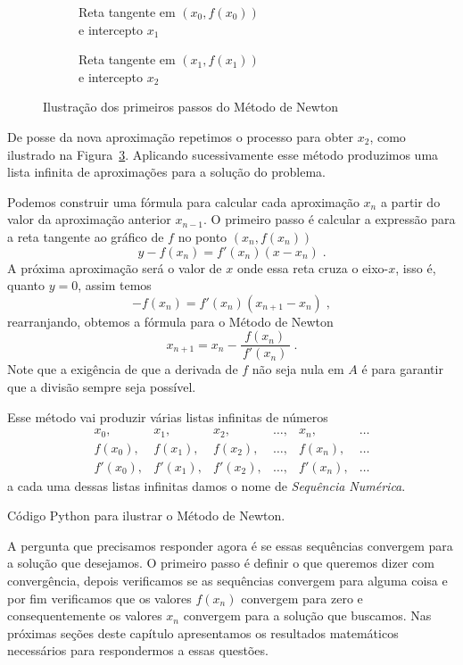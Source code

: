 \begin{figure}
  \centering
  \begin{subfigure}[b]{0.5\linewidth}
    \centering
    
    \caption{Reta tangente em $(x_0, f(x_0))$\\e intercepto $x_1$}
    \label{fig:newton_1}
  \end{subfigure}%
  \begin{subfigure}[b]{0.5\linewidth}
    \centering
    
    \caption{Reta tangente em $(x_1, f(x_1))$\\e intercepto $x_2$}
    \label{fig:newton_2}
  \end{subfigure}
  \caption{Ilustração dos primeiros passos do Método de Newton}
\end{figure}

De posse da nova aproximação repetimos o processo para obter $x_2$, como ilustrado na
Figura~\ref{fig:newton_2}. Aplicando sucessivamente esse método produzimos uma
lista infinita de aproximações para a solução do problema.

Podemos construir uma fórmula para calcular cada aproximação $x_n$ a partir do valor da
aproximação anterior $x_{n-1}$. O primeiro passo é calcular a expressão para a reta
tangente ao gráfico de $f$ no ponto $(x_n, f(x_n))$
\[
	y-f(x_n) = f'(x_n)(x-x_n)    \;.
\]
A próxima aproximação será o valor de $x$ onde essa reta cruza o eixo-$x$, isso é,
quanto $y=0$, assim temos
\[
	-f(x_n) = f'(x_n)(x_{n+1}-x_n)      \;,
\]
rearranjando, obtemos a fórmula para o Método de Newton
\[
	x_{n+1} = x_n - \frac{\,f(x_n)\,}{\,f'(x_n)\,}    \;.
\]
Note que a exigência de que a derivada de $f$ não seja nula em $A$ é para
garantir que a divisão sempre seja possível.

Esse método vai produzir várias listas infinitas de números
\[
\begin{array}{llllll}
	x_0,     & x_1,     & x_2,     & \dots, & x_n,     & \dots \\
	f(x_0),  & f(x_1),  & f(x_2),  & \dots, & f(x_n),  & \dots \\
	f'(x_0), & f'(x_1), & f'(x_2), & \dots, & f'(x_n), & \dots
\end{array}
\]
a cada uma dessas listas infinitas damos o nome de \emph{Sequência Numérica}.

{
  Código Python para ilustrar o Método de Newton.
}

A pergunta que precisamos responder agora é se essas sequências
convergem para a solução que desejamos. O primeiro passo é definir
o que queremos dizer com convergência, depois verificamos se as sequências
convergem para alguma coisa e por fim verificamos que os valores
$f(x_n)$ convergem para zero e consequentemente os valores $x_n$
convergem para a solução que buscamos. Nas próximas seções
deste capítulo apresentamos os resultados matemáticos necessários
para respondermos a essas questões.

